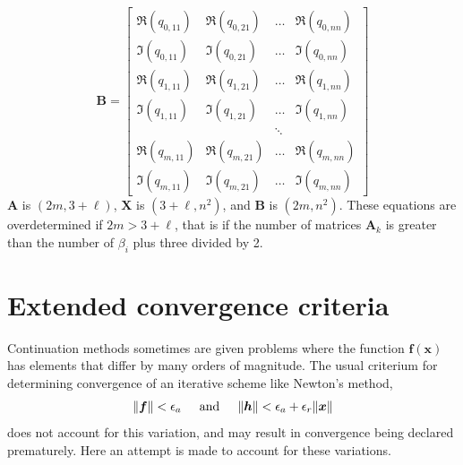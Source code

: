 \documentclass[11pt,openany,twoside]{book}
\numberwithin{equation}{section}		%
\newcommand{\Matrix}[1]{\boldsymbol{#1}}
\newcommand{\Vector}[1]{\boldsymbol{#1}}
\begin{document}
\begin{equation}
 \Matrix{B} =
\left[
\begin{array}{cccc}
\Re(q_{0,11})   & \Re(q_{0,21})   & \ldots & \Re(q_{0,nn}) \\
\Im(q_{0,11})   & \Im(q_{0,21})   & \ldots & \Im(q_{0,nn}) \\
\Re(q_{1,11})   & \Re(q_{1,21})   & \ldots & \Re(q_{1,nn}) \\
\Im(q_{1,11})   & \Im(q_{1,21})   & \ldots & \Im(q_{1,nn}) \\
                &                 & \ddots &          \\
\Re(q_{m,11}) & \Re(q_{m,21}) & \ldots & \Re(q_{m,nn}) \\
\Im(q_{m,11}) & \Im(q_{m,21}) & \ldots & \Im(q_{m,nn})
\end{array}
\right]
\end{equation}
$\Matrix{A}$ is $(2m, 3+\ell)$, $\Matrix{X}$ is $(3+\ell, n^2)$,
and $\Matrix{B}$ is $(2m, n^2)$. These equations are overdetermined
if $2m > 3+\ell$, that is if the number of matrices $\Matrix{A}_k$
is greater than the number of $\beta_i$ plus three divided by 2.

\section{Extended convergence criteria}\label{sect:ecc}
Continuation methods sometimes are given problems where the function
$\Vector{f(x)}$
has elements that differ by many orders of magnitude. The usual criterium
for determining convergence of an iterative scheme like Newton's method,
\begin{equation}
\label{eqn:tradcc}
\| \Vector{f} \| < \epsilon_{a} \hspace{0.2in} \text{and} \hspace{0.2in} \| \Vector{h} \| < \epsilon_{a} + \epsilon_{r}\| \Vector{x} \|
\end{equation}
does not account for this variation, and may result in convergence being
declared prematurely. Here an attempt is made to account for these variations.
\end{document}
